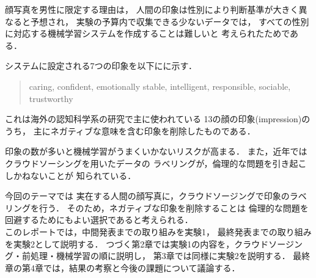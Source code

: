 顔写真を男性に限定する理由は，
人間の印象は性別により判断基準が大きく異なると予想され，
実験の予算内で収集できる少ないデータでは，
すべての性別に対応する機械学習システムを作成することは難しいと
考えられたためである．

システムに設定される7つの印象を以下にに示す．

\begin{quote}
  {\small
  caring, confident, 
  emotionally stable, intelligent, 
  responsible, sociable,
  trustworthy }
\end{quote}
  
これは海外の認知科学系の研究で主に使われている
13の顔の印象(impression)\cite{doi:10.1073/pnas.1807222115}のうち，
主にネガティブな意味を含む印象を削除したものである．

印象の数が多いと機械学習がうまくいかないリスクが高まる．
また，近年ではクラウドソーシングを用いたデータの
ラベリングが，倫理的な問題を引き起こしかねないことが
知られている\cite{ai-rinri}．

今回のテーマでは
実在する人間の顔写真に，クラウドソージングで印象のラベリングを行う．
そのため，ネガティブな印象を削除することは
倫理的な問題を回避するためにもよい選択であると考えられる．
\\

このレポートでは，中間発表までの取り組みを実験1，
最終発表までの取り組みを実験2として説明する．
つづく第2章では実験1の内容を，クラウドソージング・前処理・機械学習の順に説明し，
第3章では同様に実験2を説明する．
最終章の第4章では，結果の考察と今後の課題について議論する．